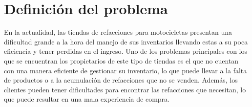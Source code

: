 \chapter{Definición del problema}
En la actualidad, las tiendas de refacciones para motocicletas presentan una dificultad grande a la hora del manejo de sus inventarios
llevando estas a su poca eficiencia y tener perdidas en el ingreso. 
\newline Uno de los problemas principales con los que se encuentran los propietarios de este tipo de tiendas es el que no cuentan con una manera 
eficiente de gestionar su inventario, lo que puede llevar a la falta de productos o a la acumulación de refacciones que no se venden.
Además, los clientes pueden tener dificultades para encontrar las refacciones que necesitan, lo que puede resultar en una mala experiencia de compra.